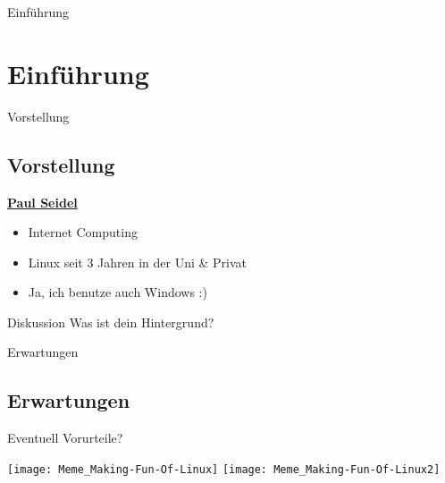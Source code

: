 
\begin{frame}{Einführung}
    \section{Einführung}\label{sec:einfuhrung}
\end{frame}

\begin{frame}{Vorstellung}
    \subsection{Vorstellung}\label{subsec:vorstellung}

    \underline{\textbf{Paul Seidel}}

    \begin{itemize}
        \item Internet Computing
        \item Linux seit 3 Jahren in der Uni \& Privat
        \item Ja, ich benutze auch Windows :)
    \end{itemize}

    \pause
    \vspace{0.5cm}
    \begin{alertblock}{Diskussion}
        Was ist dein Hintergrund?
    \end{alertblock}

\end{frame}
\begin{frame}{Erwartungen}
    \subsection{Erwartungen}\label{subsec:erwartungen}
    Eventuell Vorurteile?

        \texttt{[image: Meme\_Making-Fun-Of-Linux]}
    \endminipage\hfill
        \texttt{[image: Meme\_Making-Fun-Of-Linux2]}
    \endminipage\hfill
\end{frame}

